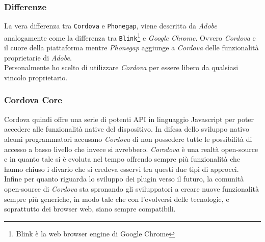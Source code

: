 \subsubsection{Differenze}
La vera differenza tra \texttt{Cordova} e \texttt{Phonegap}, viene descritta da \emph{Adobe} analogamente come la differenza tra \texttt{Blink}\footnote{Blink è la web browser engine di Google Chrome\cite{wiki:blink}} e \emph{Google Chrome}. Ovvero \emph{Cordova} e il cuore della piattaforma mentre \emph{Phonegap} aggiunge a \emph{Cordova} delle funzionalità proprietarie di \emph{Adobe}.\\
Personalmente ho scelto di utilizzare \emph{Cordova} per essere libero da qualsiasi vincolo proprietario.

\subsubsection{Cordova Core}
Cordova quindi offre una serie di potenti API in linguaggio Javascript per poter accedere alle funzionalità native del dispositivo. In difesa dello sviluppo nativo alcuni programmatori accusano \emph{Cordova} di non possedere tutte le possibilità di accesso a basso livello che invece si avrebbero. \emph{Corodova} è una realtà open-source e in quanto tale si è evoluta nel tempo offrendo sempre più funzionalità che hanno chiuso i divario che si credeva esservi tra questi due tipi di approcci.\\
Infine per quanto riguarda lo sviluppo dei plugin verso il futuro, la comunità open-source di \emph{Cordova} sta spronando gli sviluppatori a creare nuove funzionalità sempre più generiche, in modo tale che con l'evolversi delle tecnologie, e soprattutto dei browser web, siano sempre compatibili.

